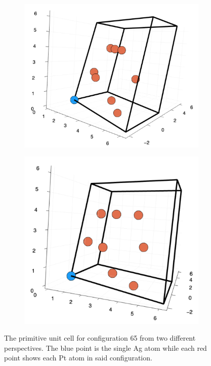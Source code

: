 \begin{figure}
  \begin{subfigure}{0.25\textwidth}
    \includegraphics[width=\linewidth]{Figures/primitiveCell1}
    \label{primitiveFirst}
  \end{subfigure}%
  \hspace*{\fill}   %
  \begin{subfigure}{0.23\textwidth}
    \includegraphics[width=\linewidth]{Figures/primitiveCell2}
    \label{primitiveSecond}
  \end{subfigure}%
\caption{The primitive unit cell for configuration 65 from two different perspectives. The blue point is the single Ag atom while each red point shows each Pt atom in said configuration.} \label{primitiveUnitCells}
\end{figure}

